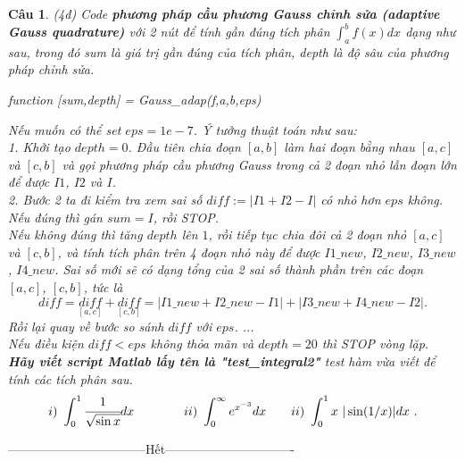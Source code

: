 \documentclass[11pt]{article}
\newtheorem{bt}{Câu}
\begin{document}
\begin{bt}(4đ) Code \textbf{phương pháp cầu phương Gauss chỉnh sửa (adaptive Gauss quadrature)} với 2 nút để tính gần đúng tích phân $\int_{a}^{b} f(x)dx$ 
dạng như sau, trong đó sum là giá trị gần đúng của tích phân, depth là độ sâu của phương pháp chỉnh sửa.
%
\begin{center}
	\emph{function [sum,depth] = Gauss\_adap(f,a,b,eps)} 
\end{center}	
%
Nếu muốn có thể set $eps = 1e-7$. Ý tưởng thuật toán như sau: \\
1. Khởi tạo $depth=0$. Đầu tiên chia đoạn $[a,b]$ làm hai đoạn bằng nhau $[a,c]$ và $[c,b]$ và gọi phương pháp cầu phương Gauss trong cả 2 đoạn nhỏ lẫn đoạn lớn để được $I1$, $I2$ và $I$. \\
2. Bước 2 ta đi kiểm tra xem sai số $diff := |I1+I2-I|$ có nhỏ hơn $eps$ không.\\ 
Nếu đúng thì gán $sum=I$, rồi STOP. \\
Nếu không đúng thì tăng $depth$ lên $1$, rồi tiếp tục chia đôi cả 2 đoạn nhỏ $[a,c]$ và $[c,b]$, và tính tích phân trên 4 đoạn nhỏ này để được $I1\_new$, $I2\_new$, $I3\_new$, $I4\_new$. Sai số mới sẽ có dạng tổng của 2 sai số thành phần trên các đoạn $[a,c]$, $[c,b]$, tức là
%
\[ diff = \underset{[a,c]}{diff} + \underset{[c,b]}{diff} = |I1\_new  +  I2\_new - I1| +  |I3\_new  +  I4\_new - I2| .\]
%
Rồi lại quay về bước so sánh $diff$ với $eps$. ...\\
Nếu điều kiện $diff<eps$ không thỏa mãn và $depth = 20$ thì STOP vòng lặp. \\ 
\textbf{Hãy viết script Matlab lấy tên là "test\_integral2"} test hàm vừa viết để tính các tích phân sau.
\[ i)\ \int_{0}^{1} \cfrac{1}{\sqrt{\sin x}} dx \qquad \qquad ii) \ \int_{0}^{\infty} e^{x^{-3}}dx  \qquad ii) \ \int_{0}^{1} x \ |\sin (1/x)|dx  \ .  \]
\end{bt}

\centerline{———————————Hết——————————-}
\end{document}
